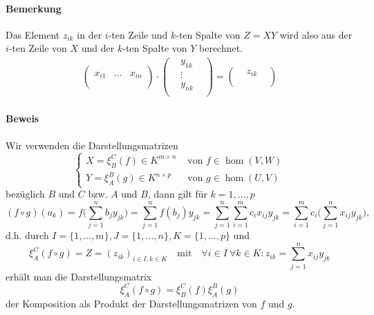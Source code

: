 \paragraph{Bemerkung}
	Das Element $ z_{ik} $ in der $ i $-ten Zeile und $ k $-ten Spalte von $ Z = XY $ wird also aus der $ i $-ten Zeile von $ X $ und der $k$-ten Spalte von $ Y $ berechnet.
	\begin{align*}
            \left(\begin{array}{ccc}
                &&\\ 
                x_{i1} & \dots & x_{in} \\
                &&\\
            \end{array}\right)
            \cdot
            \left(\begin{array}{ccc}
                &y_{1k} &\\
                &\vdots &\\
                &y_{nk} &\\
            \end{array}\right)
            =
             \left(\begin{array}{ccc}
                & z_{ik}&\\
                & &\\
            \end{array}\right)
	\end{align*}
\paragraph{Beweis}
	Wir verwenden die Darstellungsmatrizen
		\[ \begin{cases}
		X = \xi^C_B(f)\in K^{m\times n} &\text{ von } f\in \hom(V,W)\\
		Y = \xi_A^B(g)\in K^{n\times p} &\text{ von } g\in \hom(U,V)
		\end{cases} \]
	bezüglich $ B $ und $ C $ bzw. $ A $ und $ B $, dann gilt für $ k=1,\dots,p $
		\[ (f\circ g)(a_k)=f\Big(\sum_{j=1}^{n}b_jy_{jk}\Big) = \sum_{j=1}^{n}f(b_j)y_{jk} = \sum_{j=1}^{n}\sum_{i=1}^{m}c_ix_{ij}y_{jk} = \sum_{i=1}^{m}c_i\Big(\sum_{j=1}^{n}x_{ij}y_{jk}\Big), \]
	d.h. durch $ I=\{1,\dots,m\},J=\{1,\dots,n\},K=\{1,\dots,p\} $ und 
		\[ \xi_A^C(f\circ g) = Z = (z_{ik})_{i\in I,k\in K} \quad\text{mit}\quad \forall i\in I\ \forall k\in K: z_{ik}= \sum_{j=1}^{n}x_{ij}y_{jk} \]
	erhält man die Darstellungsmatrix
		\[ \xi_A^C(f\circ g) = \xi_B^C(f)\xi_A^B(g) \]
	der Komposition als Produkt der Darstellungsmatrizen von $ f $ und $ g $.
